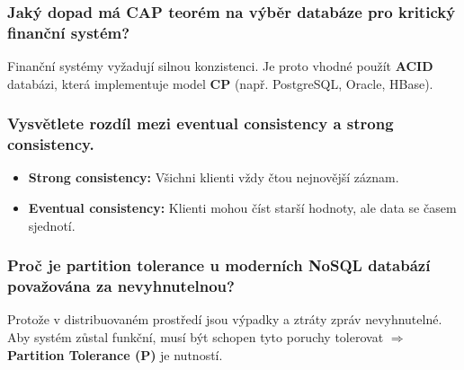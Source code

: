 \subsubsection*{Jaký dopad má CAP teorém na výběr databáze pro kritický finanční systém?}

Finanční systémy vyžadují silnou konzistenci. Je proto vhodné použít \textbf{ACID} databázi, která implementuje model \textbf{CP} (např. PostgreSQL, Oracle, HBase).

\subsubsection*{Vysvětlete rozdíl mezi eventual consistency a strong consistency.}

\begin{itemize}
    \item \textbf{Strong consistency:} Všichni klienti vždy čtou nejnovější záznam.
    \item \textbf{Eventual consistency:} Klienti mohou číst starší hodnoty, ale data se časem sjednotí.
\end{itemize}

\subsubsection*{Proč je partition tolerance u moderních NoSQL databází považována za nevyhnutelnou?}

Protože v distribuovaném prostředí jsou výpadky a ztráty zpráv nevyhnutelné. Aby systém zůstal funkční, musí být schopen tyto poruchy tolerovat $\Rightarrow$ \textbf{Partition Tolerance (P)} je nutností.
